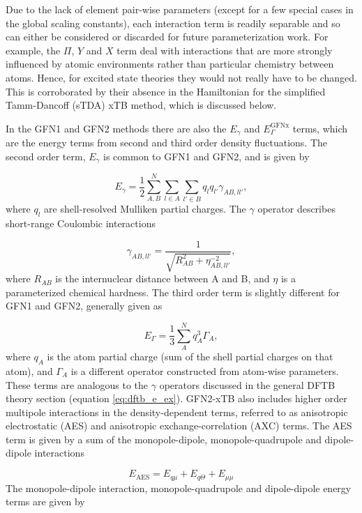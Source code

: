 Due to the lack of element pair-wise parameters (except for a few special cases 
in the global scaling constants), each interaction term is readily separable and
so can either be considered or discarded for future parameterization work. For example, 
the $\Pi$, $Y$ and $X$ term deal with interactions that are more strongly influenced
by atomic environments rather than particular chemistry between atoms. Hence, for 
excited state theories they would not really have to be changed. This is corroborated 
by their absence in the Hamiltonian for the simplified Tamm-Dancoff (sTDA) xTB \cite{Grimme2016} 
method, which is discussed below.

In the GFN1 and GFN2 methods there are also the $E_\gamma$ and $E_\Gamma^{\text{GFNx}}$ 
terms, which are the energy terms from second and third order density fluctuations. 
The second order term, $E_\gamma$ is common to GFN1 and GFN2, and is given by

\begin{equation}
E_\gamma = \frac{1}{2} \sum^{N}_{A,B} \sum_{l \in A} \sum_{l' \in B} q_l q_{l'} \gamma_{AB, ll'},
\end{equation}
%
where $q_l$ are shell-resolved Mulliken partial charges. The $\gamma$ operator describes 
short-range Coulombic interactions

\begin{equation}
\gamma_{AB, ll'} = \frac{1}{\sqrt{R^2_{AB} + \eta^{-2}_{AB, ll'}}},
\end{equation}
%
where $R_{AB}$ is the internuclear distance between A and B, and $\eta$ is a parameterized 
chemical hardness. The third order term is slightly different for GFN1 and GFN2,
generally given as

\begin{equation}
E_\Gamma = \frac{1}{3}\sum_A^N q_A^3 \Gamma_A,
\end{equation}
%
where $q_A$ is the atom partial charge (sum of the shell partial charges on that atom), 
and $\Gamma_A$ is a different operator constructed from atom-wise parameters. These
terms are analogous to the $\gamma$ operators discussed in the general DFTB theory
section (equation \ref{eq:dftb_e_ex}). GFN2-xTB also includes higher order multipole 
interactions in the density-dependent terms, referred to as anisotropic electrostatic 
(AES) and anisotropic exchange-correlation (AXC) terms. The AES term is given by 
a sum of the monopole-dipole, monopole-quadrupole and dipole-dipole interactions

\begin{equation}
    E_{\text{AES}} = E_{q\mu} + E_{q \Theta} + E_{\mu\mu}
\end{equation}
%
The monopole-dipole interaction, monopole-quadrupole and dipole-dipole energy terms 
are given by

